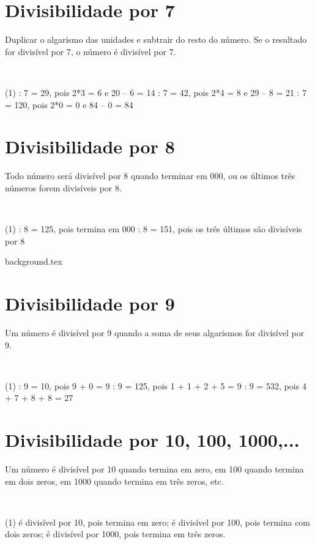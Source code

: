 \documentclass[10pt]{article}
\begin{document}
\section*{Divisibilidade por 7}
Duplicar o algarismo das unidades e subtrair do resto do número. Se o resultado for divisível por 7, o número é divisível por 7. 
\begin{exemplo}~\\
   \begin{tasks}(1)  
         : 7 = 29, pois 2*3 = 6 e 20 – 6 = 14
         : 7 = 42, pois 2*4 = 8 e 29 – 8 = 21
         : 7 = 120, pois 2*0 = 0 e 84 – 0 = 84 
   \end{tasks}
\end{exemplo}

\section*{Divisibilidade por 8}
Todo número será divisível por 8 quando terminar em 000, ou os últimos três números forem divisíveis por 8. 
\begin{exemplo}~\\
   \begin{tasks}(1)        
     : 8 = 125, pois termina em 000
     : 8 = 151, pois os três últimos são divisíveis por 8
   \end{tasks}
\end{exemplo}

\newpage
{background.tex} %
\section*{Divisibilidade por 9}
Um número é divisível por 9 quando a soma de seus algarismos for divisível por 9. 
\begin{exemplo}~\\
   \begin{tasks}(1)       
     : 9 = 10, pois 9 + 0 = 9
     : 9 = 125, pois 1 + 1 + 2 + 5 = 9
     : 9 = 532, pois 4 + 7 + 8 + 8 = 27
   \end{tasks}
\end{exemplo}

\section*{Divisibilidade por 10, 100, 1000,...}
Um número é divisível por 10 quando termina em zero, em 100 quando termina em dois zeros, em 1000 quando
termina em três zeros, etc. 
\begin{exemplo}~\\
   \begin{tasks}(1)
        é divisível por 10, pois termina em zero;
         é divisível por 100, pois termina com dois zeros;
         é divisível por 1000, pois termina em três
zeros. 
   \end{tasks}
\end{exemplo}
\end{document}
